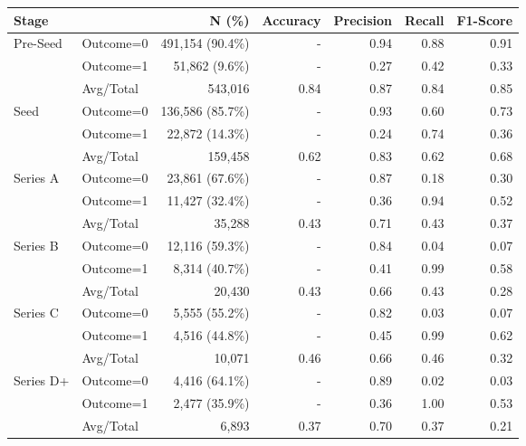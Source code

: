 \begin{tabular}{llrrrrr} \toprule
Stage        &           & N (\%)    & Accuracy & Precision   & Recall & F1-Score \\ \midrule
Pre-Seed     & Outcome=0 & 491,154 (90.4\%) & - & 0.94 & 0.88 & 0.91 \\
             & Outcome=1 & 51,862 (9.6\%) & - & 0.27 & 0.42 & 0.33 \\
             & Avg/Total & 543,016 & 0.84 & 0.87 & 0.84 & 0.85 \\
Seed         & Outcome=0 & 136,586 (85.7\%) & - & 0.93 & 0.60 & 0.73 \\
             & Outcome=1 & 22,872 (14.3\%) & - & 0.24 & 0.74 & 0.36 \\
             & Avg/Total & 159,458 & 0.62 & 0.83 & 0.62 & 0.68 \\
Series A     & Outcome=0 & 23,861 (67.6\%) & - & 0.87 & 0.18 & 0.30 \\
             & Outcome=1 & 11,427 (32.4\%) & - & 0.36 & 0.94 & 0.52 \\
             & Avg/Total & 35,288 & 0.43 & 0.71 & 0.43 & 0.37 \\
Series B     & Outcome=0 & 12,116 (59.3\%) & - & 0.84 & 0.04 & 0.07 \\
             & Outcome=1 & 8,314 (40.7\%) & - & 0.41 & 0.99 & 0.58 \\
             & Avg/Total & 20,430 & 0.43 & 0.66 & 0.43 & 0.28 \\
Series C     & Outcome=0 & 5,555 (55.2\%) & - & 0.82 & 0.03 & 0.07 \\
             & Outcome=1 & 4,516 (44.8\%) & - & 0.45 & 0.99 & 0.62 \\
             & Avg/Total & 10,071 & 0.46 & 0.66 & 0.46 & 0.32 \\
Series D+    & Outcome=0 & 4,416 (64.1\%) & - & 0.89 & 0.02 & 0.03 \\
             & Outcome=1 & 2,477 (35.9\%) & - & 0.36 & 1.00 & 0.53 \\
             & Avg/Total & 6,893 & 0.37 & 0.70 & 0.37 & 0.21 \\
\bottomrule \end{tabular}
